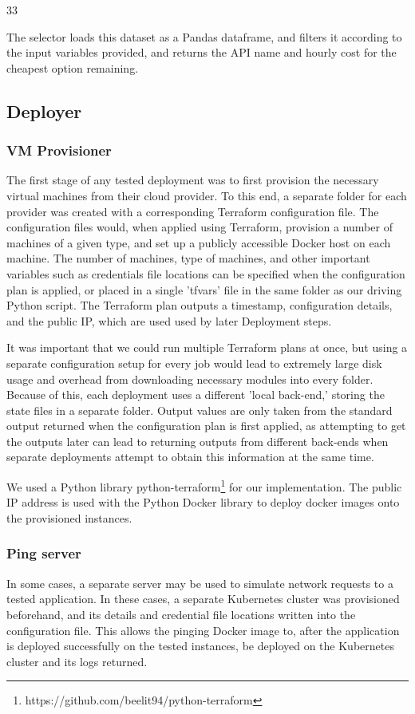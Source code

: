 33\documentclass{article}
\begin{document}
The selector loads this dataset as a Pandas dataframe, and filters it according to the input variables provided, and returns the API name and hourly cost for the cheapest option remaining.

\subsection{Deployer}
\subsubsection{VM Provisioner}
The first stage of any tested deployment was to first provision the necessary virtual machines from their cloud provider. To this end, a separate folder for each provider was created with a corresponding Terraform configuration file. The configuration files would, when applied using Terraform, provision a number of machines of a given type, and set up a publicly accessible Docker host on each machine. The number of machines, type of machines, and other important variables such as credentials file locations can be specified when the configuration plan is applied, or placed in a single 'tfvars' file in the same folder as our driving Python script. The Terraform plan outputs a timestamp, configuration details, and the public IP, which are used used by later Deployment steps.

It was important that we could run multiple Terraform plans at once, but using a separate configuration setup for every job would lead to extremely large disk usage and overhead from downloading necessary modules into every folder. Because of this, each deployment uses a different 'local back-end,' storing the state files in a separate folder. Output values are only taken from the standard output returned when the configuration plan is first applied, as attempting to get the outputs later can lead to returning outputs from different back-ends when separate deployments attempt to obtain this information at the same time.

We used a Python library python-terraform\footnote{https://github.com/beelit94/python-terraform} for our implementation. The public IP address is used with the Python Docker library to deploy docker images onto the provisioned instances.

\subsubsection{Ping server}
In some cases, a separate server may be used to simulate network requests to a tested application. In these cases, a separate Kubernetes cluster was provisioned beforehand, and its details and credential file locations written into the configuration file. This allows the pinging Docker image to, after the application is deployed successfully on the tested instances, be deployed on the Kubernetes cluster and its logs returned.
\end{document}
